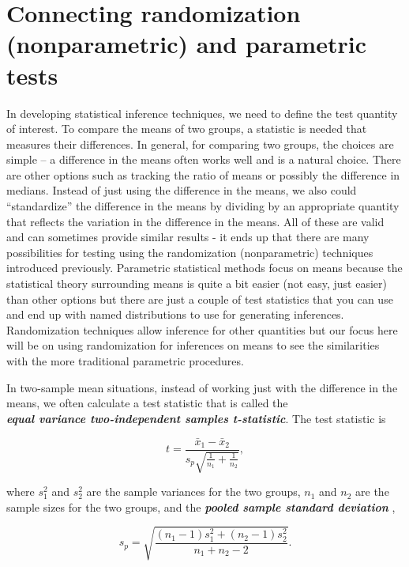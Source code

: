 \documentclass[]{book}
\begin{document}
\section{Connecting randomization (nonparametric) and parametric
tests}\label{section2-6}

In developing statistical inference techniques, we need to define the
test quantity of interest. To compare the means of two groups, a
statistic is needed that measures their differences. In general, for
comparing two groups, the choices are simple -- a difference in the
means often works well and is a natural choice. There are other options
such as tracking the ratio of means or possibly the difference in
medians. Instead of just using the difference in the means, we also
could ``standardize'' the difference in the means by dividing by an
appropriate quantity that reflects the variation in the difference in
the means. All of these are valid and can sometimes provide similar
results - it ends up that there are many possibilities for testing using
the randomization (nonparametric) techniques introduced previously.
Parametric statistical methods focus on means because the statistical
theory surrounding means is quite a bit easier (not easy, just easier)
than other options but there are just a couple of test statistics that
you can use and end up with named distributions to use for generating
inferences. Randomization techniques allow inference for other
quantities but our focus here will be on using randomization for
inferences on means to see the similarities with the more traditional
parametric procedures.

In two-sample mean situations, instead of working just with the
difference in the means, we often calculate a test statistic that is
called the\\
\textbf{\emph{equal variance two-independent samples t-statistic}}. The
test statistic is

\[t = \frac{\bar{x}_1 - \bar{x}_2}{s_p\sqrt{\frac{1}{n_1}+\frac{1}{n_2}}},\]

where \(s_1^2\) and \(s_2^2\) are the sample variances for the two
groups, \(n_1\) and \(n_2\) are the sample sizes for the two groups, and
the \textbf{\emph{pooled sample standard deviation}} ,

\[s_p = \sqrt{\frac{(n_1-1)s_1^2 + (n_2-1)s_2^2}{n_1+n_2-2}}.\]
\end{document}
